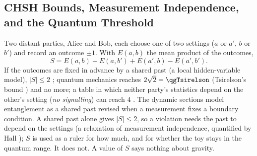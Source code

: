 \documentclass[11pt]{article}
\theoremstyle{definition}
\begin{document}
\subsection{CHSH Bounds, Measurement Independence, and the Quantum Threshold}
\label{sec:chsh}

Two distant parties, Alice and Bob, each choose one of two settings ($a$ or $a'$, $b$ or $b'$) and record an outcome $\pm1$. With $E(a,b)$ the mean product of the outcomes,
\begin{equation}\label{eq:chsh}
S=E(a,b)+E(a,b')+E(a',b)-E(a',b').
\end{equation}
If the outcomes are fixed in advance by a shared past (a local hidden-variable model), $|S|\le2$ \cite{bell1964,chsh1969}; quantum mechanics reaches $2\sqrt2=\qgTsirelson$ (Tsirelson's bound \cite{cirelson1980}) and no more; a table in which neither party's statistics depend on the other's setting (\emph{no signalling}) can reach $4$ \cite{popescu1994}. The dynamic sections model entanglement as a shared past revised when a measurement fixes a boundary condition. A shared past alone gives $|S|\le2$, so a violation needs the past to depend on the settings (a relaxation of measurement independence, quantified by Hall \cite{hall2010}); $S$ is used as a ruler for how much, and for whether the toy stays in the quantum range. It does not. A value of $S$ says nothing about gravity.


\end{document}

